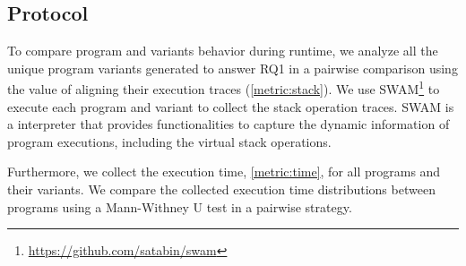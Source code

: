 
\subsection*{Protocol}

To compare program and variants behavior during runtime, we analyze all the unique program variants generated to answer RQ1 in a pairwise comparison using the value of aligning their execution traces (\autoref{metric:stack}). We use SWAM\footnote{\url{https://github.com/satabin/swam}} to execute each program and variant to collect the stack operation traces. SWAM is a \wasm interpreter that provides functionalities to capture the dynamic information of \wasm program executions, including the virtual stack operations.

Furthermore, we collect the execution time, \autoref{metric:time}, for all programs and their variants. We compare the collected execution time distributions between programs using a Mann-Withney U test \cite{mann1947} in a pairwise strategy.


 